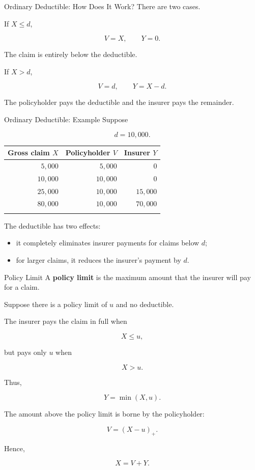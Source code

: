 \documentclass[
  ignorenonframetext,
  aspectratio=169,
]{beamer}
\newcounter{none} %
\providecommand{\tightlist}{%
  \setlength{\itemsep}{0pt}\setlength{\parskip}{0pt}}
\begin{document}
\begin{frame}{Ordinary Deductible: How Does It Work?}
\protect{}\label{ordinary-deductible-how-does-it-work}
There are two cases.

If \(X\leq d\),

\[
V=X,
\qquad
Y=0.
\]

The claim is entirely below the deductible.

If \(X>d\),

\[
V=d,
\qquad
Y=X-d.
\]

The policyholder pays the deductible and the insurer pays the remainder.
\end{frame}

\begin{frame}{Ordinary Deductible: Example}
\protect{}\label{ordinary-deductible-example-1}
Suppose

\[
d=10{,}000.
\]

{\def\LTcaptype{none} %
\begin{longtable}[]{@{}rrr@{}}
\toprule\noalign{}
Gross claim \(X\) & Policyholder \(V\) & Insurer \(Y\) \\
\midrule\noalign{}
\endhead
\(5{,}000\) & \(5{,}000\) & \(0\) \\
\(10{,}000\) & \(10{,}000\) & \(0\) \\
\(25{,}000\) & \(10{,}000\) & \(15{,}000\) \\
\(80{,}000\) & \(10{,}000\) & \(70{,}000\) \\
\bottomrule\noalign{}
\end{longtable}
}

The deductible has two effects:

\begin{itemize}
\tightlist
\item
  it completely eliminates insurer payments for claims below \(d\);
\item
  for larger claims, it reduces the insurer's payment by \(d\).
\end{itemize}
\end{frame}

\begin{frame}{Policy Limit}
\protect{}\label{policy-limit}
A \textbf{policy limit} is the maximum amount that the insurer will pay
for a claim.

Suppose there is a policy limit of \(u\) and no deductible.

The insurer pays the claim in full when

\[
X\leq u,
\]

but pays only \(u\) when

\[
X>u.
\]

Thus,

\[
\boxed{Y=\min(X,u)}.
\]

The amount above the policy limit is borne by the policyholder:

\[
\boxed{V=(X-u)_+}.
\]

Hence,

\[
X=V+Y.
\]
\end{frame}
\end{document}
